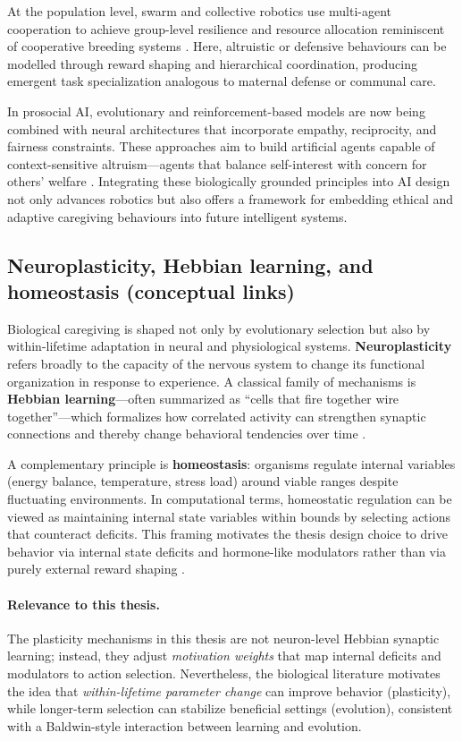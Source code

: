         At the population level, swarm and collective robotics use multi-agent cooperation to achieve group-level resilience and resource allocation reminiscent of cooperative breeding systems \cite{trianni2008, hamann2018}.  Here, altruistic or defensive behaviours can be modelled through reward shaping and hierarchical coordination, producing emergent task specialization analogous to maternal defense or communal care.
        
        In prosocial AI, evolutionary and reinforcement-based models are now being combined with neural architectures that incorporate empathy, reciprocity, and fairness constraints.  These approaches aim to build artificial agents capable of context-sensitive altruism—agents that balance self-interest with concern for others’ welfare \cite{wang2018, fortune2025}.  Integrating these biologically grounded principles into AI design not only advances robotics but also offers a framework for embedding ethical and adaptive caregiving behaviours into future intelligent systems.

    \subsection{Neuroplasticity, Hebbian learning, and homeostasis (conceptual links)}
        Biological caregiving is shaped not only by evolutionary selection but also by within-lifetime adaptation in neural and physiological systems. \textbf{Neuroplasticity} refers broadly to the capacity of the nervous system to change its functional organization in response to experience. A classical family of mechanisms is \textbf{Hebbian learning}---often summarized as ``cells that fire together wire together''---which formalizes how correlated activity can strengthen synaptic connections and thereby change behavioral tendencies over time \cite{hebb1949}.

        A complementary principle is \textbf{homeostasis}: organisms regulate internal variables (energy balance, temperature, stress load) around viable ranges despite fluctuating environments. In computational terms, homeostatic regulation can be viewed as maintaining internal state variables within bounds by selecting actions that counteract deficits. This framing motivates the thesis design choice to drive behavior via internal state deficits and hormone-like modulators rather than via purely external reward shaping \cite{cannon1932}.

        \paragraph{Relevance to this thesis.}
        The plasticity mechanisms in this thesis are not neuron-level Hebbian synaptic learning; instead, they adjust \emph{motivation weights} that map internal deficits and modulators to action selection. Nevertheless, the biological literature motivates the idea that \emph{within-lifetime parameter change} can improve behavior (plasticity), while longer-term selection can stabilize beneficial settings (evolution), consistent with a Baldwin-style interaction between learning and evolution.

